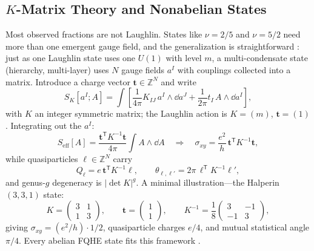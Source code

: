 \subsection{$K$-Matrix Theory and Nonabelian States}
\label{subsec:k-matrix-nonabelian}

Most observed fractions are not Laughlin. States like $\nu=2/5$ and $\nu=5/2$ need more than one emergent gauge field, and the generalization is straightforward \cite{WenZee1992AbelianQHClassification}: just as one Laughlin state uses one $U(1)$ with level $m$, a multi-condensate state (hierarchy, multi-layer) uses $N$ gauge fields $a^I$ with couplings collected into a matrix. Introduce a charge vector $\mathbf{t}\in\mathbb{Z}^N$ and write
\begin{equation}
  S_{K}[a^I;A]
  =
  \int\left[
  \frac{1}{4\pi}K_{IJ}\,a^I\wedge\dd a^J
  +
  \frac{1}{2\pi}t_I\,A\wedge\dd a^I
  \right],
  \label{eq:fqhe-k-matrix-action}
\end{equation}
with $K$ an integer symmetric matrix; the Laughlin action is $K=(m)$, $\mathbf{t}=(1)$. Integrating out the $a^I$:
\begin{equation}
  S_{\mathrm{eff}}[A]
  =
  \frac{\mathbf{t}^{\mathsf{T}}K^{-1}\mathbf{t}}{4\pi}\int A\wedge\dd A
  \quad\Longrightarrow\quad
  \sigma_{xy} = \frac{e^2}{h}\,\mathbf{t}^{\mathsf{T}}K^{-1}\mathbf{t},
  \label{eq:fqhe-k-hall}
\end{equation}
while quasiparticles $\boldsymbol{\ell}\in\mathbb{Z}^N$ carry
\begin{equation}
  Q_{\boldsymbol{\ell}} = e\,\mathbf{t}^{\mathsf{T}}K^{-1}\boldsymbol{\ell},
  \qquad
  \theta_{\boldsymbol{\ell},\boldsymbol{\ell}'} = 2\pi\,\boldsymbol{\ell}^{\mathsf{T}}K^{-1}\boldsymbol{\ell}',
\end{equation}
and genus-$g$ degeneracy is $|\det K|^{g}$. A minimal illustration---the Halperin $(3,3,1)$ state:
\begin{equation}
  K = \begin{pmatrix} 3 & 1 \\ 1 & 3\end{pmatrix},
  \qquad
  \mathbf{t} = \begin{pmatrix}1\\1\end{pmatrix},
  \qquad
  K^{-1} = \frac{1}{8}\begin{pmatrix} 3 & -1 \\ -1 & 3\end{pmatrix},
\end{equation}
giving $\sigma_{xy} = (e^{2}/h)\cdot 1/2$, quasiparticle charges $e/4$, and mutual statistical angle $\pi/4$. Every abelian FQHE state fits this framework \cite{WenZee1992AbelianQHClassification,Wen1995TopologicalOrdersEdgeExcitations,HalperinJain2020FQHENewDevelopments}.

